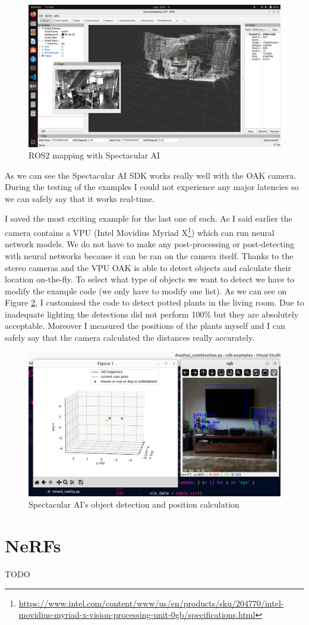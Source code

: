 \begin{figure}[H]
	\centering
	\includegraphics[width=150mm, keepaspectratio]{figures/spectacular_ai_mapping_ros2.png}
	\caption{ROS2 mapping with Spectacular AI}
	\label{fig:SPAI_ros_mapping}
\end{figure}

As we can see the Spectacular AI SDK works really well with the OAK camera. During the testing of the examples I could not experience any major latencies so we can safely say that it works real-time.

I saved the most exciting example for the last one of each. As I said earlier the camera contains a VPU (Intel Movidius Myriad X\footnote{\url{https://www.intel.com/content/www/us/en/products/sku/204770/intel-movidius-myriad-x-vision-processing-unit-0gb/specifications.html}}) which can run neural network models. We do not have to make any post-processing or post-detecting with neural networks because it can be ran on the camera itself. Thanks to the stereo cameras and the VPU OAK is able to detect objects and calculate their location on-the-fly. To select what type of objects we want to detect we have to modify the example code (we only have to modify one list). As we can see on Figure \ref{fig:SPAI_depthai}, I customised the code to detect potted plants in the living room. Due to inadequate lighting the detections did not perform 100\% but they are absolutely acceptable. Moreover I measured the positions of the plants myself and I can safely say that the camera calculated the distances really accurately.

\begin{figure}[H]
	\centering
	\includegraphics[width=150mm, keepaspectratio]{figures/spectacular_ai_depthai_combination.png}
	\caption{Spectacular AI's object detection and position calculation}
	\label{fig:SPAI_depthai}
\end{figure}

\section{NeRFs}

TODO
